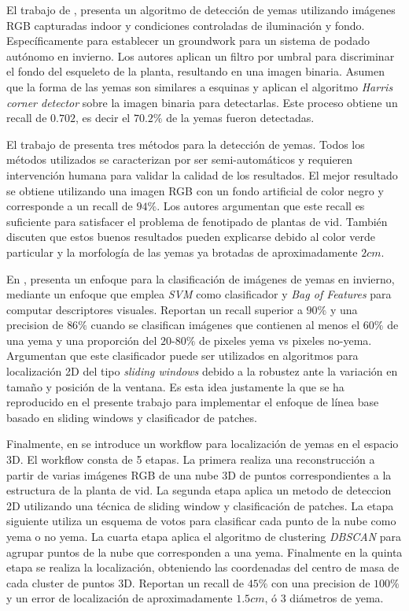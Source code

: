\documentclass[a4paper,authoryear,review]{elsarticle}
\begin{document}
	El trabajo de \citet{xu2014detection}, presenta un algoritmo de detección de yemas utilizando imágenes RGB capturadas indoor y condiciones controladas de iluminación y fondo. Específicamente para establecer un groundwork para un sistema de podado autónomo en invierno. Los autores aplican un filtro por umbral para discriminar el fondo del esqueleto de la planta, resultando en una imagen binaria. Asumen que la forma de las yemas son similares a esquinas y aplican el algoritmo \emph{Harris corner detector} sobre la imagen binaria para detectarlas. Este proceso obtiene un recall de $0.702$, es decir el $70.2\%$ de la yemas fueron detectadas. 
	
	El trabajo de \citet{herzog2014initial} presenta tres métodos para la detección de yemas. Todos los métodos utilizados se caracterizan por ser semi-automáticos y requieren intervención humana para validar la calidad de los resultados. El mejor resultado se obtiene utilizando una imagen RGB con un fondo artificial de color negro y corresponde a un recall de $94\%$. Los autores argumentan que este recall es suficiente para satisfacer el problema de fenotipado de plantas de vid. También discuten que estos buenos resultados pueden explicarse debido al color verde particular y la morfología de las yemas ya brotadas de aproximadamente $2cm$. 
	
	En \citet{perez2017image}, presenta un enfoque para la clasificación de imágenes de yemas en invierno, mediante un enfoque que emplea \emph{SVM} como clasificador y \emph{Bag of Features} para computar descriptores visuales. Reportan un recall superior a $90\%$ y una precision de $86\%$ cuando se clasifican imágenes que contienen al menos el $60\%$ de una yema y una proporción del $20$-$80\%$ de pixeles yema vs pixeles no-yema. Argumentan que este clasificador puede ser utilizados en algoritmos para localización 2D del tipo \emph{sliding windows} debido a la robustez ante la variación en tamaño y posición de la ventana. Es esta idea justamente la que se ha reproducido en el presente trabajo para implementar el enfoque de línea base basado en sliding windows y clasificador de patches.
	
	Finalmente, en \citet{diaz2018grapevine} se introduce un workflow para localización de yemas en el espacio 3D. El workflow consta de 5 etapas. La primera realiza una reconstrucción a partir de varias imágenes RGB de una nube 3D de puntos correspondientes a la estructura de la planta de vid. La segunda etapa aplica un metodo de deteccion 2D utilizando una técnica de sliding window y clasificación de patches. La etapa siguiente utiliza un esquema de votos para clasificar cada punto de la nube como yema o no yema. La cuarta etapa aplica el algoritmo de clustering \emph{DBSCAN} para agrupar puntos de la nube que corresponden a una yema. Finalmente en la quinta etapa se realiza la localización, obteniendo las coordenadas del centro de masa de cada cluster de puntos 3D. Reportan un recall de $45\%$ con una precision de $100\%$ y un error de localización de aproximadamente $1.5cm$, ó 3 diámetros de yema. 
	
\end{document}
